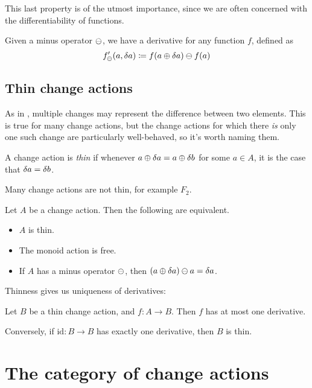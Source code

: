 This last property is of the utmost importance, since we are often concerned with the differentiability
of functions.

\begin{defn}
  Given a minus operator $\ominus$, we have a derivative for any function $f$,
  defined as
  $$f'_\ominus(a, \delta a) \coloneqq f(a \oplus \delta a) \ominus f(a)$$
\end{defn}

\subsection{Thin change actions}
\label{sec:thin}

As in \textcite{cai2014changes}, multiple changes may represent the difference
between two elements. This is true for many change actions, but the change
actions for which there \emph{is} only one such change are particularly
well-behaved, so it's worth naming them.

\begin{defn}
  A change action is \textit{thin} if whenever $a \oplus \delta a
  = a \oplus \delta b$ for some $a \in A$, it is the case that $\delta a = \delta b$.
\end{defn}

Many change actions are not thin, for example $F_2$.

\begin{prop}
  Let $A$ be a change action. Then the following are equivalent.
  \begin{itemize}
    \item $A$ is thin.
    \item The monoid action is free.
    \item If $A$ has a minus operator $\ominus$, then $(a \oplus \delta a)
      \ominus a = \delta a$.
  \end{itemize}
\end{prop}

Thinness gives us uniqueness of derivatives:

\begin{prop}
  Let $B$ be a thin change action, and $f: A \rightarrow B$. Then $f$ has at
  most one derivative.

  Conversely, if $\textrm{id}: B \rightarrow B$ has exactly one derivative, then
  $B$ is thin.
\end{prop}

\section{The category of change actions}
\label{sec:category}

